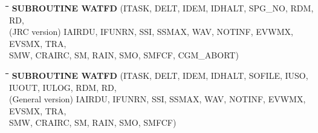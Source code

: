 \bigskip
\bigskip
\nwln
\begin{tabbing}
\hspace{1.27cm}\=\hspace{1.27cm}\=\hspace{1.27cm}\=\hspace{1.27cm}\=%
\hspace{1.27cm}\=\hspace{1.27cm}\=\hspace{1.27cm}\=\hspace{1.27cm}\=%
\hspace{1.27cm}\=\hspace{1.27cm}\=\kill
{\bf SUBROUTINE WATFD}\> \> \> (ITASK, DELT, IDEM, IDHALT, SPG\_NO, RDM, RD,\\
(JRC version) \> \> \>  IAIRDU, IFUNRN, SSI, SSMAX, WAV, NOTINF, EVWMX, EVSMX, TRA,\\
 \>\> \>  SMW, CRAIRC, SM, RAIN, SMO, SMFCF, CGM\_ABORT)
\end{tabbing}
\nwln
\begin{tabbing}
\hspace{1.27cm}\=\hspace{1.27cm}\=\hspace{1.27cm}\=\hspace{1.27cm}\=%
\hspace{1.27cm}\=\hspace{1.27cm}\=\hspace{1.27cm}\=\hspace{1.27cm}\=%
\hspace{1.27cm}\=\hspace{1.27cm}\=\kill
{\bf SUBROUTINE WATFD}\> \> \> (ITASK, DELT, IDEM, IDHALT, SOFILE, IUSO, IUOUT, IULOG, RDM, RD,\\
(General version) \> \> \> IAIRDU, IFUNRN, SSI, SSMAX, WAV, NOTINF, EVWMX, EVSMX, TRA,\\
 \>\> \>  SMW, CRAIRC, SM, RAIN, SMO, SMFCF)
\end{tabbing}
\nwln
